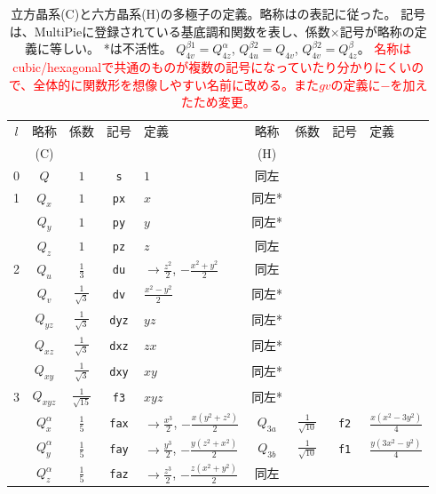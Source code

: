 \documentclass[11pt]{easymemo}
\begin{document}
\begin{table}[ht!]
\begin{center}
\caption{立方晶系(C)と六方晶系(H)の多極子の定義。略称は\cite{Hayami18,Yatsushiro22}の表記に従った。
記号は、MultiPieに登録されている基底調和関数を表し、係数$\times$記号が略称の定義に等しい。
*は不活性。
$Q_{4v}^{\beta1}=Q_{4z}^\alpha$, $Q_{4u}^{\beta2}=Q_{4v}$, $Q_{4v}^{\beta2}=Q_{4z}^\beta$。
\textcolor{red}{名称はcubic/hexagonalで共通のものが複数の記号になっていたり分かりにくいので、全体的に関数形を想像しやすい名前に改める。また$gv$の定義に$-$を加えたため変更。}
\label{tbl:muldef}}
\renewcommand{\arraystretch}{1.3}
\scriptsize
\begin{tabular}{c||c|c|c|l||c|c|c|l} \hline \hline
$l$ & 略称 & 係数 & 記号 & 定義 & 略称 & 係数 & 記号 & 定義 \\
& (C) & & & & (H) & & & \\ \hline
0 & $Q$ & $1$ & \texttt{s} & $ 1 $ & 同左 & & & \\
\hline
1 & $Q_x$ & $1$ & \texttt{px} & $ x $ & 同左* & & & \\
  & $Q_y$ & $1$ & \texttt{py} & $ y $ & 同左* & & & \\
  & $Q_z$ & $1$ & \texttt{pz} & $ z $ & 同左 & & & \\
\hline
2 & $Q_u$ & $\frac{1}{3}$ & \texttt{du} & $\to\frac{z^2}{2}$, $-\frac{x^2+y^2}{2}$ & 同左 & & & \\
  & $Q_v$ & $\frac{1}{\sqrt{3}}$ & \texttt{dv} & $ \frac{x^2 - y^2}{2} $ & 同左* & & & \\
  & $Q_{yz}$ & $\frac{1}{\sqrt{3}}$ & \texttt{dyz} & $ y z $ & 同左* & & & \\
  & $Q_{xz}$ & $\frac{1}{\sqrt{3}}$ & \texttt{dxz} & $ z x $ & 同左* & & & \\
  & $Q_{xy}$ & $\frac{1}{\sqrt{3}}$ & \texttt{dxy} & $ x y $ & 同左* & & & \\
 \hline
3 & $Q_{xyz}$ & $\frac{1}{\sqrt{15}}$ & \texttt{f3} & $ x y z $ & 同左* & & & \\
  & $Q_x^\alpha$ & $\frac{1}{5}$ & \texttt{fax} & $\to\frac{x^3}{2}$, $-\frac{x(y^2+z^2)}{2}$ &
$Q_{3a}$ & $\frac{1}{\sqrt{10}}$ & \texttt{f2} & $ \frac{x(x^{2}-3y^{2})}{4}$ \\
  & $Q_y^\alpha$ & $\frac{1}{5}$ & \texttt{fay} & $\to\frac{y^3}{2}$, $-\frac{y(z^2+x^2)}{2}$ &
$Q_{3b}$ & $\frac{1}{\sqrt{10}}$ & \texttt{f1} & $ \frac{y(3x^{2}-y^{2})}{4}$ \\
  & $Q_z^\alpha$ & $\frac{1}{5}$ & \texttt{faz} & $\to\frac{z^3}{2}$, $-\frac{z(x^2+y^2)}{2}$ & 同左 & & & \\

\end{tabular}
\end{center}
\end{table}
\end{document}
